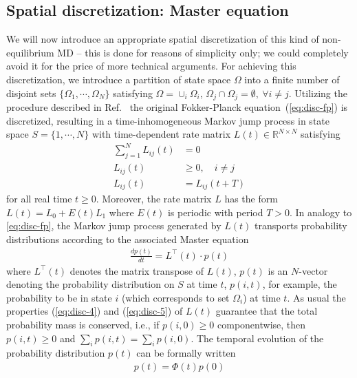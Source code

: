\documentclass[aps, pre, preprint,unsortedaddress,a4paper,onecolumn,showkeys]{revtex4}
\newcommand{\vect}[1]{#1}
\newcommand{\myphi}{\Phi}
\begin{document}
\subsection{Spatial discretization: Master equation}
We will now introduce an appropriate spatial discretization of this kind of non-equilibrium MD --  this is done for reasons of simplicity only; we could completely avoid it for the price of more technical arguments.
For achieving this discretization, we 
introduce a partition of state space $\Omega$ into a finite number of disjoint
sets $\{ \Omega_1, \cdots, \Omega_N\}$ satisfying $\Omega = \cup_i \Omega_i$,
$\Omega_j\cap \Omega_j = \emptyset,\ \forall i\neq j$.
Utilizing the procedure described in Ref.~\cite{latorre2011structure} the original Fokker-Planck equation~(\ref{eq:disc-fp})
is discretized, resulting in a time-inhomogeneous Markov jump process in state
space $S = \{1, \cdots, N\}$ with time-dependent rate
matrix $\vect L(t) \in \mathbb R^{N\times N}$ satisfying
\begin{align}\label{eq:disc-4}
\sum\limits_{j=1}^N L_{ij}(t) & =  0\\ \label{eq:disc-5}
L_{ij}(t) & \ge  0, \quad i\not= j\\
L_{ij}(t) & =  L_{ij}(t+T)
\end{align}
for all real time $t\geq 0$.
Moreover, the rate matrix $L$ has the form $\vect L(t)=\vect L_0+E(t)\vect L_1$
where $E(t)$ is periodic with period $T>0$.
In analogy to \eqref{eq:disc-fp}, the Markov jump process generated by
$\vect L(t)$ transports probability distributions according to the associated Master equation
\begin{align}
  \label{eq:disc-master}
  \frac{d\vect p(t)}{dt} = \vect L^{\top}(t)\cdot \vect p(t)
\end{align}
where $\vect L^{\top}(t)$ denotes the matrix transpose of $\vect L(t)$, $\vect p(t)$ is an $N$-vector denoting the probability distribution on $S$ at time $t$, $p(i,t)$, for example, the probability to be in state $i$ (which corresponds to set $\Omega_i$) at time $t$.
As usual the properties (\ref{eq:disc-4}) and (\ref{eq:disc-5}) of
$\vect L(t)$ guarantee that the total probability mass is conserved,
i.e., if $p(i,0)\ge 0$ componentwise, then $p(i,t)\ge 0$ and $\sum_i
p(i,t) = \sum_ip(i,0)$.
The temporal evolution of the probability distribution $\vect p(t)$ can be formally written
\begin{align}  \label{eq:disc-8}
\vect p(t)=\myphi(t)\vect p(0)
\end{align}
\end{document}
